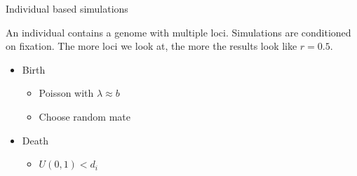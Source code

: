 \documentclass{beamer}
\begin{document}
\begin{frame}{Individual based simulations}
    
    An individual contains a genome with multiple loci. Simulations are conditioned on fixation. The more loci we look at, the more the results look like $r=0.5$.
    
    \vfill

    \begin{minipage}{0.45\textwidth}
    \begin{itemize}
      \item Birth \\
          \begin{itemize}
          \item{Poisson with  $\lambda \approx b$}
          \item{Choose random mate}
        \end{itemize}
      \item Death \\
      \begin{itemize}
          \item $\textit{U}(0,1) < d_i$
      \end{itemize}
    \end{itemize}
    \end{minipage}%
    \hfill
    \begin{minipage}{0.45\textwidth}
    \end{minipage}%


\end{frame}
\end{document}
